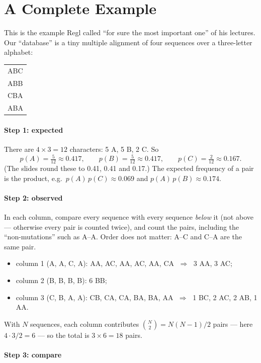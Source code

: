 \documentclass[11pt, oneside]{book}
\makeatletter
\newcommand{\alnblock}[1]{%
  \par\smallskip
  {\centering\ttfamily\small
   \begin{tabular}{@{}l@{}}#1\end{tabular}\par}%
  \smallskip}
\let\originalsection\section
\renewcommand{\section}{\Needspace{7\baselineskip}\originalsection}
\makeatother
\begin{document}
\section{A Complete Example}
\label{sec:logodds-example}

This is the example Regl called ``for sure the most important one'' of his
lectures. Our ``database'' is a tiny multiple alignment of four sequences over
a three-letter alphabet:

\alnblock{%
ABC\\
ABB\\
CBA\\
ABA}

\paragraph{Step 1: expected}
There are $4 \times 3 = 12$ characters: 5 A, 5 B, 2 C. So
\[
  p(A) = \tfrac{5}{12} \approx 0.417, \qquad
  p(B) = \tfrac{5}{12} \approx 0.417, \qquad
  p(C) = \tfrac{2}{12} \approx 0.167 .
\]
(The slides round these to 0.41, 0.41 and 0.17.) The expected frequency of a
pair is the product, e.g.\ $p(A)\,p(C) \approx 0.069$ and
$p(A)\,p(B) \approx 0.174$.

\paragraph{Step 2: observed}
In each column, compare every sequence with every sequence \emph{below} it
(not above --- otherwise every pair is counted twice), and count the pairs,
including the ``non-mutations'' such as A--A. Order does not matter: A--C and
C--A are the same pair.
\begin{itemize}
  \item column 1 (A, A, C, A): AA, AC, AA, AC, AA, CA $\;\Rightarrow\;$ 3 AA, 3 AC;
  \item column 2 (B, B, B, B): 6 BB;
  \item column 3 (C, B, A, A): CB, CA, CA, BA, BA, AA $\;\Rightarrow\;$ 1 BC,
    2 AC, 2 AB, 1 AA.
\end{itemize}
With $N$ sequences, each column contributes $\binom{N}{2} = N(N-1)/2$ pairs ---
here $4 \cdot 3 / 2 = 6$ --- so the total is $3 \times 6 = 18$ pairs.

\paragraph{Step 3: compare}
\end{document}
